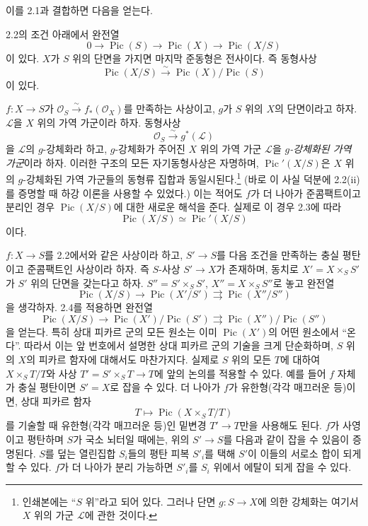 이를 2.1과 결합하면 다음을 얻는다.

 2.2의 조건 아래에서 완전열
\[
0\longrightarrow\operatorname{Pic}(S)\longrightarrow\operatorname{Pic}(X)
\longrightarrow\operatorname{Pic}(X/S)
\]
이 있다. $X$가 $S$ 위의 단면을 가지면 마지막 준동형은 전사이다. 즉
동형사상
\[
\operatorname{Pic}(X/S)\xrightarrow{\sim}
\operatorname{Pic}(X)/\operatorname{Pic}(S)
\]
이 있다.

 $f:X\longrightarrow S$가
$\mathcal O_S\xrightarrow{\sim}f_*(\mathcal O_X)$를 만족하는 사상이고,
$g$가 $S$ 위의 $X$의 단면이라고 하자. $\mathcal L$을 $X$ 위의 가역
가군이라 하자. 동형사상
\[
\mathcal O_S\xrightarrow{\sim}g^*(\mathcal L)
\]
을 $\mathcal L$의 $g$-강체화라 하고, $g$-강체화가 주어진 $X$ 위의 가역
가군 $\mathcal L$을 \emph{$g$-강체화된 가역 가군}이라 하자. 이러한
구조의 모든 자기동형사상은 자명하며, $\operatorname{Pic}'(X/S)$은 $X$
위의 $g$-강체화된 가역 가군들의 동형류 집합과
동일시된다.\footnote{인쇄본에는 “$S$ 위”라고 되어 있다. 그러나 단면
$g:S\to X$에 의한 강체화는 여기서 $X$ 위의 가군 $\mathcal L$에 관한
것이다.} (바로 이 사실 덕분에 2.2(ii)를 증명할 때 하강 이론을 사용할 수
있었다.) 이는 적어도 $f$가 더 나아가 준콤팩트이고 분리인 경우
$\operatorname{Pic}(X/S)$에 대한 새로운 해석을 준다. 실제로 이 경우
2.3에 따라
\[
\operatorname{Pic}(X/S)\simeq\operatorname{Pic}'(X/S)
\]
이다.

 $f:X\longrightarrow S$를 2.2에서와 같은 사상이라
하고, $S'\longrightarrow S$를 다음 조건을 만족하는 충실 평탄이고
준콤팩트인 사상이라 하자. 즉 $S$-사상 $S'\longrightarrow X$가 존재하며,
동치로 $X'=X\times_SS'$가 $S'$ 위의 단면을 갖는다고 하자.
$S''=S'\times_SS'$, $X''=X\times_SS''$로 놓고 완전열
\[
\operatorname{Pic}(X/S)\longrightarrow\operatorname{Pic}(X'/S')
\rightrightarrows\operatorname{Pic}(X''/S'')
\]
을 생각하자. 2.4를 적용하면 완전열
\[
\operatorname{Pic}(X/S)\longrightarrow
\operatorname{Pic}(X')/\operatorname{Pic}(S')
\rightrightarrows
\operatorname{Pic}(X'')/\operatorname{Pic}(S'')
\]
을 얻는다. 특히 상대 피카르 군의 모든 원소는 이미
$\operatorname{Pic}(X')$의 어떤 원소에서 “온다”. 따라서 이는 앞
번호에서 설명한 상대 피카르 군의 기술을 크게 단순화하며, $S$ 위의 $X$의
피카르 함자에 대해서도 마찬가지다. 실제로 $S$ 위의 모든 $T$에 대하여
$X\times_ST/T$와 사상 $T'=S'\times_ST\longrightarrow T$에 앞의 논의를
적용할 수 있다. 예를 들어 $f$ 자체가 충실 평탄이면 $S'=X$로 잡을 수
있다. 더 나아가 $f$가 유한형(각각 매끄러운 등)이면, 상대 피카르 함자
\[
T\longmapsto\operatorname{Pic}(X\times_ST/T)
\]
를 기술할 때 유한형(각각 매끄러운 등)인 밑변경
$T'\longrightarrow T$만을 사용해도 된다. $f$가 사영이고 평탄하며 $S$가
국소 뇌터일 때에는, 위의 $S'\longrightarrow S$를 다음과 같이 잡을 수
있음이 증명된다. $S$를 덮는 열린집합 $S_i$들의 평탄 피복 $S'_i$를 택해
$S'$이 이들의 서로소 합이 되게 할 수 있다. $f$가 더 나아가 분리
가능하면 $S'_i$를 $S_i$ 위에서 에탈이 되게 잡을 수 있다.

